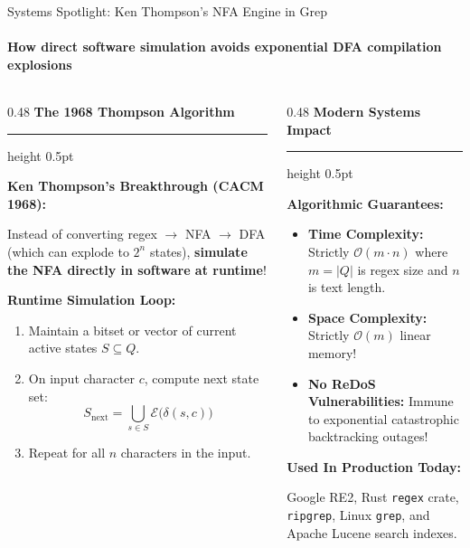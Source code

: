 \documentclass[aspectratio=169, 10pt]{beamer}
\newcommand{\colheader}[1]{%
  {\noindent\footnotesize\bfseries\color{gimpanavy}#1}%
  \vspace{0.02cm}%
  {\color{gimpanavy!30}\hrule height 0.5pt}%
  \vspace{0.05cm}%
}
\newcommand{\cardtitle}[1]{{\noindent\footnotesize\bfseries\color{gimpanavy}#1}\par\vspace{0.03cm}}
\begin{document}
\begin{frame}{Systems Spotlight: Ken Thompson's NFA Engine in Grep}
  \framesubtitle{How direct software simulation avoids exponential DFA compilation explosions}
  
  \begin{columns}[T]
    \begin{column}{0.48\textwidth}
      \colheader{The 1968 Thompson Algorithm}
      \begin{tcolorbox}[conceptcard]
        \cardtitle{Ken Thompson's Breakthrough (CACM 1968):}
        {\scriptsize
        Instead of converting regex $\to$ NFA $\to$ DFA (which can explode to $2^n$ states), \textbf{simulate the NFA directly in software at runtime}!
        \vspace{0.04cm}
        
        \textbf{Runtime Simulation Loop:}
        \begin{enumerate}\setlength{\itemsep}{1.5pt}\scriptsize
          \item Maintain a bitset or vector of current active states $S \subseteq Q$.
          \item On input character $c$, compute next state set:
          \[ S_{\text{next}} = \bigcup_{s \in S} \mathcal{E}\bigl(\delta(s, c)\bigr) \]
          \item Repeat for all $n$ characters in the input.
        \end{enumerate}
        }
      \end{tcolorbox}
    \end{column}
    
    \begin{column}{0.48\textwidth}
      \colheader{Modern Systems Impact}
      \begin{tcolorbox}[spotlightcard]
        \cardtitle{Algorithmic Guarantees:}
        \begin{itemize}\setlength{\itemsep}{2pt}\scriptsize
          \item \textbf{Time Complexity:} Strictly $\mathcal{O}(m \cdot n)$ where $m = |Q|$ is regex size and $n$ is text length.
          \item \textbf{Space Complexity:} Strictly $\mathcal{O}(m)$ linear memory!
          \item \textbf{No ReDoS Vulnerabilities:} Immune to exponential catastrophic backtracking outages!
        \end{itemize}
        \vspace{0.03cm}
        \cardtitle{Used In Production Today:}
        {\scriptsize
        Google RE2, Rust \texttt{regex} crate, \texttt{ripgrep}, Linux \texttt{grep}, and Apache Lucene search indexes.
        }
      \end{tcolorbox}
    \end{column}
  \end{columns}
\end{frame}
\end{document}
